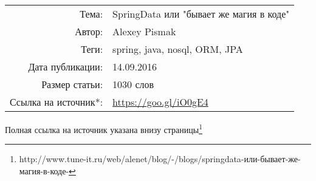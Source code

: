 \begin{tabular}{rl}
	Тема:&SpringData или "бывает же магия в коде"\\
    	Автор:&Alexey Pismak\\
	Теги:&spring, java, nosql, ORM, JPA \\
    	Дата публикации:& 14.09.2016\\
   	 Размер статьи:&1030 слов\\
	Ссылка на источник*:& \url{https://goo.gl/iO0gE4}
\end{tabular}
\par
{\small*Полная ссылка на источник указана внизу страницы\footnote{\label{full_link} http://www.tune-it.ru/web/alenet/blog/-/blogs/springdata-или-бывает-же-магия-в-коде-}}